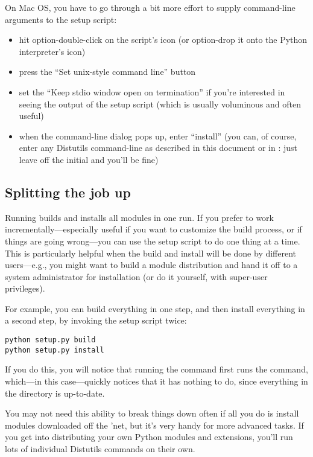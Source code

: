 \documentclass{howto}
\begin{document}
On Mac OS, you have to go through a bit more effort to supply
command-line arguments to the setup script:
\begin{itemize}
\item hit option-double-click on the script's icon (or option-drop it
  onto the Python interpreter's icon)
\item press the ``Set unix-style command line'' button
\item set the ``Keep stdio window open on termination'' if you're
  interested in seeing the output of the setup script (which is usually
  voluminous and often useful)
\item when the command-line dialog pops up, enter ``install'' (you
  can, of course, enter any Distutils command-line as described in this
  document or in : just leave off the initial  and
  you'll be fine)
\end{itemize}


\subsection{Splitting the job up}
\label{splitting-up}

Running  builds and installs all modules in one
run.  If you prefer to work incrementally---especially useful if you
want to customize the build process, or if things are going wrong---you
can use the setup script to do one thing at a time.  This is
particularly helpful when the build and install will be done by
different users---e.g., you might want to build a module distribution
and hand it off to a system administrator for installation (or do it
yourself, with super-user privileges).

For example, you can build everything in one step, and then install
everything in a second step, by invoking the setup script twice:

\begin{verbatim}
python setup.py build
python setup.py install
\end{verbatim}

If you do this, you will notice that running the 
command first runs the  command, which---in this
case---quickly notices that it has nothing to do, since everything in
the  directory is up-to-date.

You may not need this ability to break things down often if all you do
is install modules downloaded off the 'net, but it's very handy for more
advanced tasks.  If you get into distributing your own Python modules
and extensions, you'll run lots of individual Distutils commands on
their own.
\end{document}
